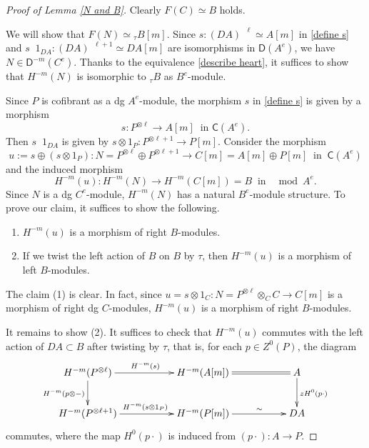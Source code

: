 \documentclass[a4paper,reqno,11pt]{amsart}
\theoremstyle{definition}
\newcommand{\CCC}{\mathsf{C}}
\newcommand{\DDD}{\mathsf{D}}
\newcommand{\Lotimes}{\mathop{\stackrel{\mathbf{L}}{\otimes}}\nolimits}
\numberwithin{equation}{section}
\begin{document}
\begin{proof}[Proof of Lemma \ref{N and B}]
Clearly $F(C)\simeq B$ holds. 

We will show that $F(N)\simeq{}_\tau B[m]$. Since $s:(DA)^{\Lotimes\ell}\simeq A[m]$ in \eqref{define s} and $s\Lotimes1_{DA}:(DA)^{\Lotimes\ell+1}\simeq DA[m]$ are isomorphisms in $\DDD(A^e)$, we have $N\in\DDD^{-m}(C^e)$.
Thanks to the equivalence \eqref{describe heart}, it suffices to show that $H^{-m}(N)$ is isomorphic to ${}_\tau B$ as $B^e$-module. 

Since $P$ is cofibrant as a dg $A^e$-module, the morphism $s$ in \eqref{define s} is given by a morphism
\[s:P^{\otimes\ell}\to A[m]\ \mbox{ in }\CCC(A^e).\]
Then $s\Lotimes1_{DA}$ is given by $s\otimes 1_P:P^{\otimes\ell+1}\to P[m]$. Consider the morphism
\[u:=s\oplus(s\otimes 1_P):N=P^{\otimes\ell}\oplus P^{\otimes\ell+1}\to C[m]=A[m]\oplus P[m]\ \mbox{ in }\ \CCC(A^e)\]
and the induced morphism
\[H^{-m}(u):H^{-m}(N)\to H^{-m}(C[m])=B\ \mbox{ in }\ \mod A^e.\]
Since $N$ is a dg $C^e$-module, $H^{-m}(N)$ has a natural $B^e$-module structure. To prove our claim, it suffices to show the following.
\begin{enumerate}
\item $H^{-m}(u)$ is a morphism of right $B$-modules.
\item If we twist the left action of $B$ on $B$ by $\tau$, then $H^{-m}(u)$ is a morphism of left $B$-modules.
\end{enumerate}
The claim (1) is clear. In fact, since $u=s\otimes1_C:N=P^{\otimes\ell}\otimes_C C\to C[m]$ is a morphism of right dg $C$-modules,  $H^{-m}(u)$ is a morphism of right $B$-modules.

It remains to show (2). It suffices to check that $H^{-m}(u)$ commutes with the left action of $DA\subset B$ after twisting by $\tau$, that is, for each $p\in Z^0(P)$, the diagram
\begin{equation}\label{show commutative}
\xymatrix{H^{-m}(P^{\otimes\ell})\ar[rr]^{H^{-m}(s)}\ar[d]_{H^{-m}(p\otimes-)}&& H^{-m}(A[m]) \ar@{=}[rr] &&A\ar[d]^{zH^0(p\cdot)}\\
H^{-m}(P^{\otimes\ell+1})\ar[rr]^{H^{-m}(s\otimes1_P)}&&H^{-m}(P[m])\ar[rr]^(.6)\sim&&DA}
\end{equation}
commutes, where the map $H^0(p\cdot)$ is induced from $(p\cdot):A\to P$.


\end{proof}
\end{document}
